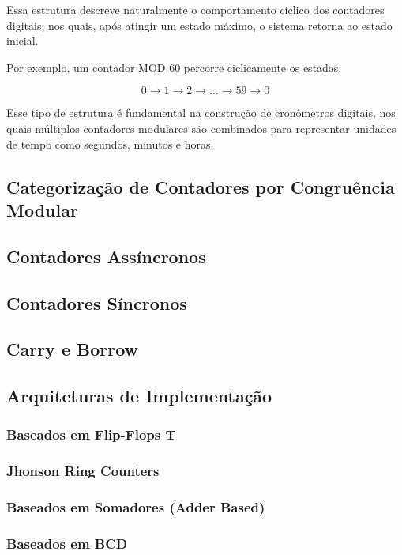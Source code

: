 \documentclass[a4paper,12pt]{article}
\begin{document}
Essa estrutura descreve naturalmente o comportamento cíclico dos contadores digitais, nos quais, após atingir um estado máximo, o sistema retorna ao estado inicial.

Por exemplo, um contador MOD 60 percorre ciclicamente os estados:

\[
0 \rightarrow 1 \rightarrow 2 \rightarrow \dots \rightarrow 59 \rightarrow 0
\]

Esse tipo de estrutura é fundamental na construção de cronômetros digitais, nos quais múltiplos contadores modulares são combinados para representar unidades de tempo como segundos, minutos e horas.


\subsection{Categorização de Contadores por Congruência Modular}

\subsection{Contadores Assíncronos}

\subsection{Contadores Síncronos}

\subsection{Carry e Borrow}

\subsection{Arquiteturas de Implementação}

\subsubsection{Baseados em Flip-Flops T}

\subsubsection{Jhonson Ring Counters}
\subsubsection{Baseados em Somadores (Adder Based)}

\subsubsection{Baseados em BCD}
\end{document}
